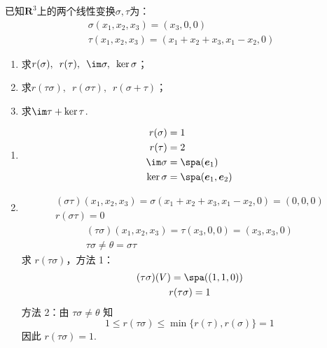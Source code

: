 \begin{exercise}
\begin{exgroup}
        \item 已知$\mathbf{R}^3$上的两个线性变换$\sigma,\tau$为：
        \begin{gather*}
            \sigma(x_1,x_2,x_3)=(x_3,0,0) \\
            \tau(x_1,x_2,x_3)=(x_1+x_2+x_3,x_1-x_2,0)
        \end{gather*}
        \begin{enumerate}
            \item 求$r(\sigma),\enspace r(\tau),\enspace \im\sigma,\enspace \ker\sigma$；

            \item 求$r(\tau\sigma),\enspace r(\sigma\tau),\enspace r(\sigma+\tau)$；

            \item 求$\im\tau+\ker\tau$.
        \end{enumerate}
        \begin{answer}
            \begin{enumerate}
                \item \begin{align*}
                          r(\sigma)   & = 1                          \\
                          r(\tau)     & = 2                          \\
                          \im \sigma  & = \spa(\vec{e}_1)            \\
                          \ker \sigma & = \spa(\vec{e}_1, \vec{e}_2)
                      \end{align*}

                \item \begin{gather*}
                          (\sigma \tau)(x_1, x_2, x_3) = \sigma(x_1 + x_2 + x_3, x_1 - x_2, 0) = (0, 0, 0) \\
                          r(\sigma \tau) = 0
                      \end{gather*}
                      \begin{gather*}
                          (\tau \sigma)(x_1, x_2, x_3) = \tau(x_3, 0, 0) = (x_3, x_3, 0) \\
                          \tau \sigma \neq \theta = \sigma \tau
                      \end{gather*}
                      求 $ r(\tau \sigma) $，方法 1：
                      \begin{gather*}
                          (\tau \sigma)(V) = \spa((1, 1, 0)) \\
                          r(\tau \sigma) = 1
                      \end{gather*}
                      方法 2：由 $ \tau \sigma \neq \theta $ 知
                      \[ 1 \leqslant r(\tau \sigma) \leqslant \min\{r(\tau), r(\sigma)\} = 1 \]
                      因此 $ r(\tau \sigma) = 1 $.


\end{enumerate}
\end{answer}
\end{exgroup}
\end{exercise}
